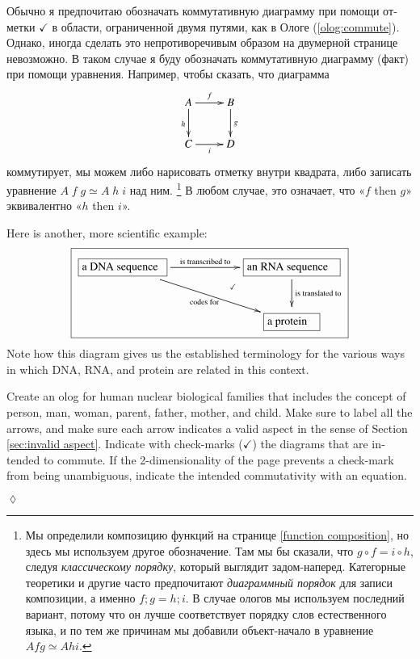 \documentclass{book}
\def\tn{\textnormal}
\newcommand{\LA}[2]{\ar[#1]^-{\tn {#2}}}
\newcommand{\LAL}[2]{\ar[#1]_-{\tn {#2}}}
\newcommand{\obox}[3]{\stackrel{#1}{\fbox{\parbox{#2}{#3}}}}
\theoremstyle{theoremENG}
\theoremstyle{lemmaENG}
\theoremstyle{propositionENG}
\theoremstyle{corollaryENG}
\theoremstyle{factENG}
\theoremstyle{remarkENG}
\theoremstyle{exampleENG}
\theoremstyle{warningENG}
\theoremstyle{questionENG}
\theoremstyle{guessENG}
\theoremstyle{answerENG}
\theoremstyle{constructionENG}
\theoremstyle{rulesENG}
\theoremstyle{excENG}
\newtheorem{excENG}[subsubsection]{\begin{english}Exercise\end{english}}
\theoremstyle{appENG}
\theoremstyle{definitionENG}
\theoremstyle{notationENG}
\theoremstyle{conjectureENG}
\theoremstyle{postulateENG}
\newenvironment{exerciseENG}{\begin{excENG}}{\hspace*{\fill}$\lozenge$\end{excENG}}
\theoremstyle{theoremRUS}
\theoremstyle{lemmaRUS}
\theoremstyle{propositionRUS}
\theoremstyle{corollaryRUS}
\theoremstyle{factRUS}
\theoremstyle{remarkRUS}
\theoremstyle{exampleRUS}
\theoremstyle{warningRUS}
\theoremstyle{questionRUS}
\theoremstyle{guessRUS}
\theoremstyle{answerRUS}
\theoremstyle{constructionRUS}
\theoremstyle{rulesRUS}
\theoremstyle{excRUS}
\theoremstyle{appRUS}
\theoremstyle{definitionRUS}
\theoremstyle{notationRUS}
\theoremstyle{conjectureRUS}
\theoremstyle{postulateRUS}
\begin{document}
\begin{english}
\begin{russian}Обычно я предпочитаю обозначать коммутативную диаграмму при помощи отметки $\checkmark$ в области, ограниченной двумя путями, как в Ологе (\ref{olog:commute}).  Однако, иногда сделать это непротиворечивым образом на двумерной странице невозможно.  В таком случае я буду обозначать коммутативную диаграмму (факт) при помощи уравнения.  Например, чтобы сказать, что диаграмма $$\xymatrix{A\ar[r]^f\ar[d]_h&B\ar[d]^g\\C\ar[r]_i&D}$$ коммутирует, мы можем либо нарисовать отметку внутри квадрата, либо записать уравнение $A\;f\;g\simeq A\;h\;i$ над ним.
\footnote{Мы определили композицию функций на странице \ref{function composition}, но здесь мы используем другое обозначение. Там мы бы сказали, что $g\circ f = i\circ h$, следуя {\em классическому порядку}, который выглядит задом-наперед. Категорные теоретики и другие часто предпочитают {\em диаграммный порядок} для записи композиции, а именно $f;g = h;i$. В случае ологов мы используем последний вариант, потому что он лучше соответствует порядку слов естественного языка, и по тем же причинам мы добавили объект-начало в уравнение $A f g \simeq A h i$.}
 В любом случае, это означает, что «$f$ then $g$» эквивалентно «$h$ then $i$». \end{russian}

Here is another, more scientific example:
\begin{align*}
\fbox{\xymatrix{
\obox{}{1in}{a DNA sequence}\LA{rr}{is transcribed to}\LAL{drr}{codes for}&\hspace{.1in}&\obox{}{1.1in}{an RNA sequence}\ar@{}[dll]|(.35){\checkmark}\LA{d}{is translated to}\\
&&\obox{}{.6in}{a protein}}}
\end{align*}
Note how this diagram gives us the established terminology for the various ways in which DNA, RNA, and protein are related in this context.

\begin{russian} \end{russian}

\begin{exerciseENG}\label{exc:family olog}

Create an olog for human nuclear biological families that includes the concept of person, man, woman, parent, father, mother, and child. Make sure to label all the arrows, and make sure each arrow indicates a valid aspect in the sense of Section \ref{sec:invalid aspect}. Indicate with check-marks ($\checkmark$) the diagrams that are intended to commute. If the 2-dimensionality of the page prevents a check-mark from being unambiguous, indicate the intended commutativity with an equation.


\end{exerciseENG}
\end{english}
\end{document}
